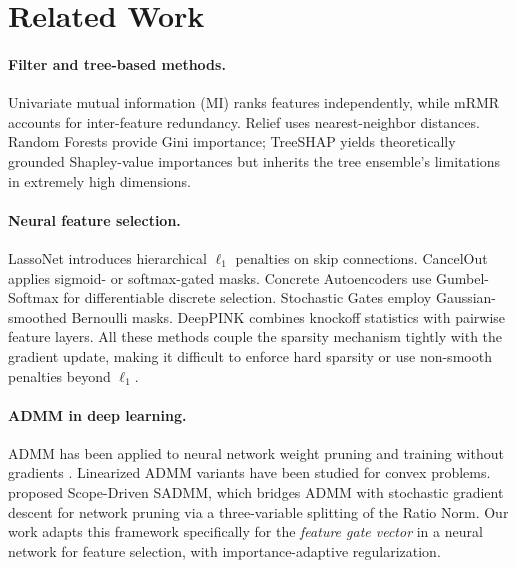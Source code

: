\documentclass{uai2026} %
\theoremstyle{definition}
\theoremstyle{remark}
\begin{document}
\section{Related Work}\label{sec:related}

\paragraph{Filter and tree-based methods.}
Univariate mutual information (MI) ranks features independently, while mRMR \citep{peng2005mrmr} accounts for inter-feature redundancy.
Relief \citep{kira1992relief} uses nearest-neighbor distances.
Random Forests \citep{breiman2001random} provide Gini importance; TreeSHAP \citep{lundberg2017shap} yields theoretically grounded Shapley-value importances but inherits the tree ensemble's limitations in extremely high dimensions.

\paragraph{Neural feature selection.}
LassoNet \citep{lemhadri2021lassonet} introduces hierarchical $\ell_1$ penalties on skip connections.
CancelOut \citep{borisov2019cancelout} applies sigmoid- or softmax-gated masks.
Concrete Autoencoders \citep{balin2019concrete} use Gumbel-Softmax for differentiable discrete selection.
Stochastic Gates \citep{yamada2020stg} employ Gaussian-smoothed Bernoulli masks.
DeepPINK \citep{lu2018deeppink} combines knockoff statistics with pairwise feature layers.
All these methods couple the sparsity mechanism tightly with the gradient update, making it difficult to enforce hard sparsity or use non-smooth penalties beyond $\ell_1$.

\paragraph{ADMM in deep learning.}
ADMM has been applied to neural network weight pruning \citep{ren2019admm} and training without gradients \citep{taylor2016admm}.
Linearized ADMM variants \citep{lin2011linearized, yang2013linearized} have been studied for convex problems.
\citet{yu2026sadmm} proposed Scope-Driven SADMM, which bridges ADMM with stochastic gradient descent for network pruning via a three-variable splitting of the Ratio Norm.
Our work adapts this framework specifically for the \emph{feature gate vector} in a neural network for feature selection, with importance-adaptive regularization.
\end{document}
